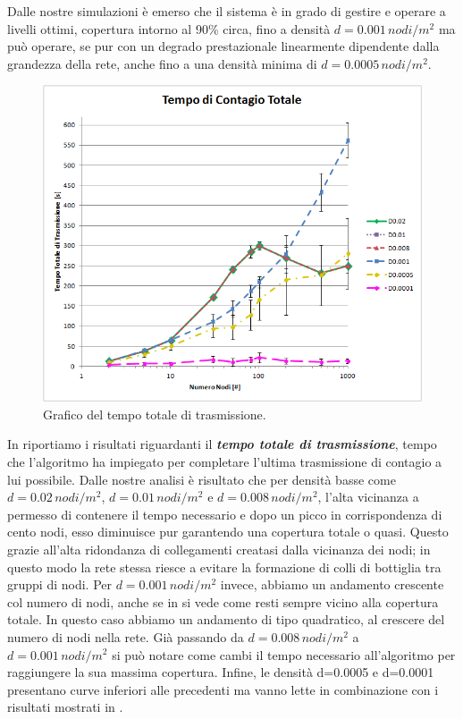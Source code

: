 Dalle nostre simulazioni è emerso che il sistema è in grado di gestire e operare a livelli ottimi, copertura intorno al 90\% circa, fino a densità $d=0.001\, nodi/m^2$ ma può operare, se pur con un degrado prestazionale linearmente dipendente dalla grandezza della rete, anche fino a una densità minima di $d=0.0005\, nodi/m^2$.
\begin{figure}[t]
	\centering
	\includegraphics[width=0.9\linewidth]{Images/risultati/tempo_totale}
	\caption[Tempo totale di trasmissione]{Grafico del tempo totale di trasmissione.}
	\label{fig:tempo_totale}
\end{figure}
In  riportiamo i risultati riguardanti il \textbf{\textit{tempo totale di trasmissione}}, tempo che l'algoritmo ha impiegato per completare l'ultima trasmissione di contagio a lui possibile. Dalle nostre analisi è risultato che per densità basse come $d=0.02\, nodi/m^2$, $d=0.01\, nodi/m^2$ e $d=0.008\, nodi/m^2$, l'alta vicinanza a permesso di contenere il tempo necessario e dopo un picco in corrispondenza di cento nodi, esso diminuisce pur garantendo una copertura totale o quasi. Questo grazie all'alta ridondanza di collegamenti creatasi dalla vicinanza dei nodi; in questo modo la rete stessa riesce a evitare la formazione di colli di bottiglia tra gruppi di nodi. Per $d=0.001\, nodi/m^2$ invece, abbiamo un andamento crescente col numero di nodi, anche se in  si vede come resti sempre vicino alla copertura totale.  In questo caso abbiamo un andamento di tipo quadratico, al crescere del numero di nodi nella rete. Già passando da $d=0.008\, nodi/m^2$ a $d=0.001\, nodi/m^2$ si può notare come cambi il tempo necessario all'algoritmo per raggiungere la sua massima copertura. Infine, le densità d=0.0005 e d=0.0001 presentano curve inferiori alle precedenti ma vanno lette in combinazione con i risultati mostrati in . 
